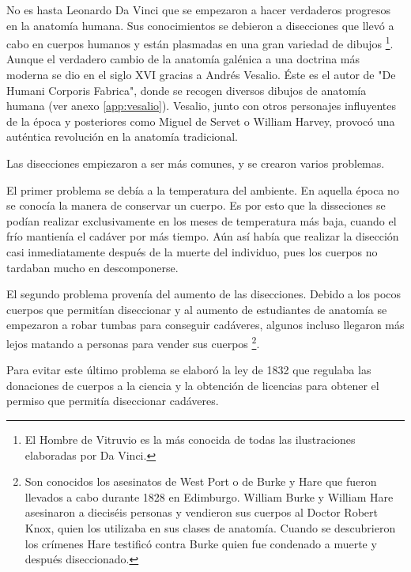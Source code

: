 No es hasta Leonardo Da Vinci que se empezaron a hacer verdaderos progresos en la anatomía humana. Sus conocimientos se debieron a disecciones que llevó a cabo en cuerpos humanos y están plasmadas en una gran variedad de dibujos \footnote{El Hombre de Vitruvio es la más conocida de todas las ilustraciones elaboradas por Da Vinci.}. Aunque el verdadero cambio de la anatomía galénica a una doctrina más moderna se dio en el siglo XVI gracias a Andrés Vesalio. Éste es el autor de "De Humani Corporis Fabrica", donde se recogen diversos dibujos de anatomía humana (ver anexo \autoref{app:vesalio}). Vesalio, junto con otros personajes influyentes de la época y posteriores como Miguel de Servet o William Harvey, provocó una auténtica revolución en la anatomía tradicional.


Las disecciones empiezaron a ser más comunes, y se crearon varios problemas.

El primer problema se debía a la temperatura del ambiente. En aquella época no se conocía la manera de conservar un cuerpo. Es por esto que la disseciones se podían realizar exclusivamente en los meses de temperatura más baja, cuando el frío mantienía el cadáver por más tiempo. Aún así había que realizar la disección casi inmediatamente después de la muerte del individuo, pues los cuerpos no tardaban mucho en descomponerse.

El segundo problema provenía del aumento de las disecciones. Debido a los pocos cuerpos que permitían diseccionar y al aumento de estudiantes de anatomía se empezaron a robar tumbas para conseguir cadáveres, algunos incluso llegaron más lejos matando a personas para vender sus cuerpos \footnote{Son conocidos los asesinatos de West Port o de Burke y Hare que fueron llevados a cabo durante 1828 en Edimburgo. William Burke y William Hare asesinaron a dieciséis personas y vendieron sus cuerpos al Doctor Robert Knox, quien los utilizaba en sus clases de anatomía. Cuando se descubrieron los crímenes Hare testificó contra Burke quien fue condenado a muerte y después diseccionado.}.

Para evitar este último problema se elaboró la ley de 1832 que regulaba las donaciones de cuerpos a la ciencia y la obtención de licencias para obtener el permiso que permitía diseccionar cadáveres.


